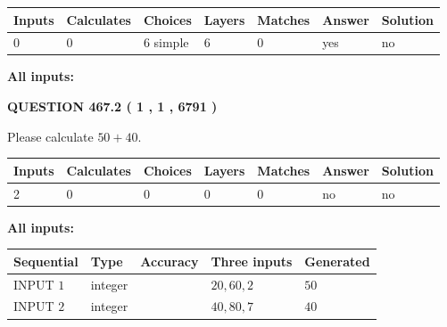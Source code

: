 \documentclass[12pt]{article}
\begin{document}
 
   
   
   
   
\noindent\begin{tabular}{|l|l|l|l|l|l|l|}
 \hline
Inputs & Calculates & Choices & Layers & Matches & Answer & Solution \\ \hline
 0  & 
 0  & 
 6
  simple  
  & 
 6  & 
 0  & 
  yes & 
  no 
  \\ \hline
 \end{tabular}
   
   
   
   
\noindent{}
   
   
   
   
\noindent\vspace{0.1in}\hspace{-0.08in} {\textbf{\Large{All inputs: }}}
   
   
  
\vspace{0.2in}
  
{\textbf{\Large{QUESTION
467.2 
 ( 1 , 1 , 6791 )
}}}
  
  
 
Please calculate $ %
50 +  %
40 $.
 
 
   
   
   
   
\noindent\begin{tabular}{|l|l|l|l|l|l|l|}
 \hline
Inputs & Calculates & Choices & Layers & Matches & Answer & Solution \\ \hline
 2  & 
 0  & 
 0
  & 
 0  & 
 0  & 
  no & 
  no 
  \\ \hline
 \end{tabular}
   
   
   
   
\noindent{}
   
   
   
   
\noindent\vspace{0.1in}\hspace{-0.08in} {\textbf{\Large{All inputs: }}}
   
   
  
  
\noindent\begin{tabular}{|l|l|l|l|l|}
\hline
 Sequential & Type & Accuracy & Three inputs & Generated \\ 
\hline
 
 
  INPUT $  1 $ & integer &  & $
 20
 , 
 60
 , 
 2
 $ & $ 50 $ 
 \\  \hline  
 
 
  INPUT $  2 $ & integer &  & $
 40
 , 
 80
 , 
 7
 $ & $ 40 $ 
 \\  \hline  
 \end{tabular}
   
\end{document}
